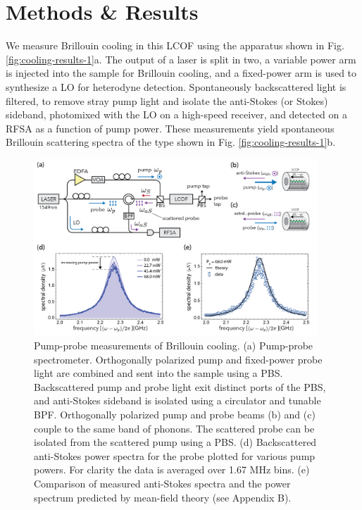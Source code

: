 \section{Methods \& Results}
We measure Brillouin cooling in this \ac{LCOF} using the apparatus shown in Fig. \ref{fig:cooling-results-1}a. The output of a laser is split in two, a variable power arm is injected into the sample for Brillouin cooling, and a fixed-power arm is used to synthesize a \ac{LO} for heterodyne detection. Spontaneously backscattered light is filtered, to remove stray pump light and isolate the anti-Stokes (or Stokes) sideband, photomixed with the \ac{LO} on a high-speed receiver, and detected on a \ac{RFSA} as a function of pump power. These measurements yield spontaneous Brillouin scattering spectra of the type shown in Fig. \ref{fig:cooling-results-1}b.

\begin{figure}[t]
    \centering \includegraphics[width=0.95\textwidth]{figs/3-Cooling/apparatus_pump_probe_v4-01.png}
    \caption{Pump-probe measurements of Brillouin cooling. (a) Pump-probe spectrometer. Orthogonally polarized pump and fixed-power probe light are combined and sent into the sample using a \ac{PBS}. Backscattered pump and probe light exit distinct ports of the PBS, and anti-Stokes sideband is isolated using a circulator and tunable  \ac{BPF}. Orthogonally polarized pump and probe beams (b) and (c) couple to the same band of phonons. The scattered probe can be isolated from the scattered pump using a PBS.
    (d) Backscattered anti-Stokes power spectra for the probe plotted for various pump powers. For clarity the data is averaged over 1.67 MHz bins. (e) Comparison of measured anti-Stokes spectra and the power spectrum predicted by mean-field theory (see Appendix B).}
    \label{fig:cooling-results-2}
\end{figure}

